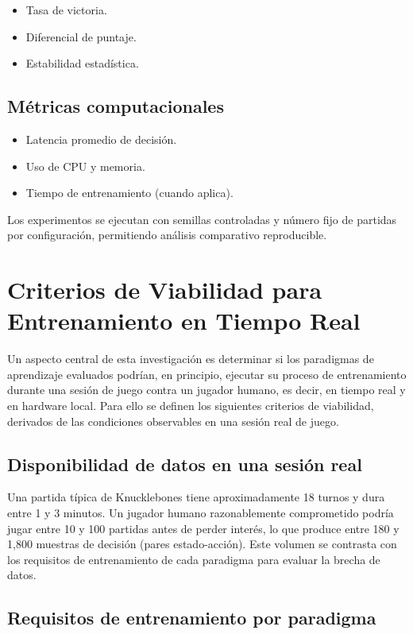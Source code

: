 \begin{itemize}
    \item Tasa de victoria.
    \item Diferencial de puntaje.
    \item Estabilidad estadística.
\end{itemize}

\subsection{Métricas computacionales}

\begin{itemize}
    \item Latencia promedio de decisión.
    \item Uso de CPU y memoria.
    \item Tiempo de entrenamiento (cuando aplica).
\end{itemize}

Los experimentos se ejecutan con semillas controladas y número fijo de partidas por configuración, permitiendo análisis comparativo reproducible.

\section{Criterios de Viabilidad para Entrenamiento en Tiempo Real}

Un aspecto central de esta investigación es determinar si los paradigmas de aprendizaje evaluados podrían, en principio, ejecutar su proceso de entrenamiento durante una sesión de juego contra un jugador humano, es decir, en tiempo real y en hardware local. Para ello se definen los siguientes criterios de viabilidad, derivados de las condiciones observables en una sesión real de juego.

\subsection{Disponibilidad de datos en una sesión real}

Una partida típica de Knucklebones tiene aproximadamente 18 turnos y dura entre 1 y 3 minutos. Un jugador humano razonablemente comprometido podría jugar entre 10 y 100 partidas antes de perder interés, lo que produce entre 180 y 1,800 muestras de decisión (pares estado-acción). Este volumen se contrasta con los requisitos de entrenamiento de cada paradigma para evaluar la brecha de datos.

\subsection{Requisitos de entrenamiento por paradigma}


